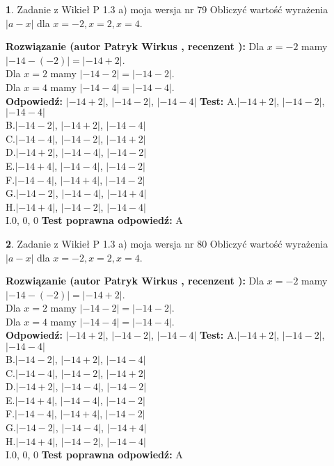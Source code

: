 \documentclass[12pt, a4paper]{article}
\theoremstyle{definition} %
\newtheorem{zad}{}
\newcommand{\zadStart}[1]{\begin{zad}#1\newline}
\newcommand{\zadStop}{\end{zad}}
\newcommand{\rozwStart}[2]{\noindent \textbf{Rozwiązanie (autor #1 , recenzent #2): }\newline}
\newcommand{\rozwStop}{\newline}
\newcommand{\odpStart}{\noindent \textbf{Odpowiedź:}\newline}
\newcommand{\odpStop}{\newline}
\newcommand{\testStart}{\noindent \textbf{Test:}\newline}
\newcommand{\testStop}{\newline}
\newcommand{\kluczStart}{\noindent \textbf{Test poprawna odpowiedź:}\newline}
\newcommand{\kluczStop}{\newline}
\begin{document}
\zadStart{Zadanie z Wikieł P 1.3 a) moja wersja nr 79}
Obliczyć wartość wyrażenia $|a - x|$ dla $x=-2,x=2,x=4$.
\zadStop
\rozwStart{Patryk Wirkus}{}
Dla $x = -2$ mamy $|-14 - (-2)| = |-14 + 2|$.\\
Dla $x = 2$ mamy $|-14 - 2| = |-14 - 2|$.\\
Dla $x = 4$ mamy $|-14 - 4| = |-14 - 4|$.\\
\rozwStop
\odpStart
$|-14 + 2|$, $|-14 - 2|$, $|-14 - 4|$
\odpStop
\testStart
A.$|-14 + 2|$, $|-14 - 2|$, $|-14 - 4|$\\
B.$|-14 - 2|$, $|-14 + 2|$, $|-14 - 4|$\\
C.$|-14 - 4|$, $|-14 - 2|$, $|-14 + 2|$\\
D.$|-14 + 2|$, $|-14 - 4|$, $|-14 - 2|$\\
E.$|-14 + 4|$, $|-14 - 4|$, $|-14 - 2|$\\
F.$|-14 - 4|$, $|-14 + 4|$, $|-14 - 2|$\\
G.$|-14 - 2|$, $|-14 - 4|$, $|-14 + 4|$\\
H.$|-14 + 4|$, $|-14 - 2|$, $|-14 - 4|$\\
I.$0$, $0$, $0$
\testStop
\kluczStart
A
\kluczStop



\zadStart{Zadanie z Wikieł P 1.3 a) moja wersja nr 80}
Obliczyć wartość wyrażenia $|a - x|$ dla $x=-2,x=2,x=4$.
\zadStop
\rozwStart{Patryk Wirkus}{}
Dla $x = -2$ mamy $|-14 - (-2)| = |-14 + 2|$.\\
Dla $x = 2$ mamy $|-14 - 2| = |-14 - 2|$.\\
Dla $x = 4$ mamy $|-14 - 4| = |-14 - 4|$.\\
\rozwStop
\odpStart
$|-14 + 2|$, $|-14 - 2|$, $|-14 - 4|$
\odpStop
\testStart
A.$|-14 + 2|$, $|-14 - 2|$, $|-14 - 4|$\\
B.$|-14 - 2|$, $|-14 + 2|$, $|-14 - 4|$\\
C.$|-14 - 4|$, $|-14 - 2|$, $|-14 + 2|$\\
D.$|-14 + 2|$, $|-14 - 4|$, $|-14 - 2|$\\
E.$|-14 + 4|$, $|-14 - 4|$, $|-14 - 2|$\\
F.$|-14 - 4|$, $|-14 + 4|$, $|-14 - 2|$\\
G.$|-14 - 2|$, $|-14 - 4|$, $|-14 + 4|$\\
H.$|-14 + 4|$, $|-14 - 2|$, $|-14 - 4|$\\
I.$0$, $0$, $0$
\testStop
\kluczStart
A
\kluczStop
\end{document}
